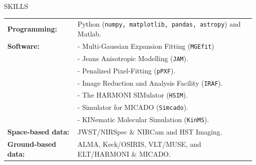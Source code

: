 \documentclass{resume} %
\begin{document}
\begin{rSection}{SKILLS}

\begin{tabular}{ @{} >{\bfseries}l @{\hspace{6ex}} l }
Programming: & Python ({\tt numpy, matplotlib, pandas, astropy}) and Matlab.
\\
{Software:} & %
- Multi-Gaussian Expansion Fitting (\texttt{MGEfit})\\
&- Jeans Anisotropic Modelling (\texttt{JAM}). \\
&- Penalized Pixel-Fitting (\texttt{pPXF}). \\
&- Image Reduction and Analysis Facility (\texttt{IRAF}).\\
&- The HARMONI SIMulator (\texttt{HSIM}).\\
&- Simulator for MICADO (\texttt{Simcado}). \\
&- KINematic Molecular Simulation (\texttt{KinMS}). \\
Space-based data: & JWST/NIRSpec $\&$ NIRCam and  HST Imaging. \\
Ground-based data: & ALMA, Keck/OSIRIS, VLT/MUSE, and ELT/HARMONI $\&$ MICADO.\\
\end{tabular}\\
\end{rSection}
\end{document}
